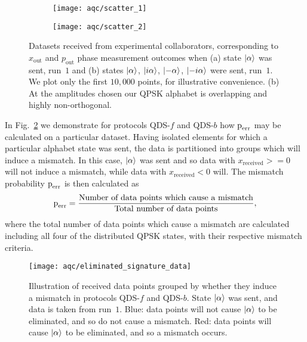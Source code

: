 \begin{figure}[htp]
\centering
	\begin{subfigure}{0.49\linewidth}
	\centering
	\texttt{[image: aqc/scatter\_1]}
	\caption{}
	\end{subfigure}
	\begin{subfigure}{0.49\linewidth}
	\centering
	\texttt{[image: aqc/scatter\_2]}
	\end{subfigure}
\caption{\label{fig:aqc_scatter} Datasets received from experimental collaborators, corresponding to $x_{\text{out}}$ and $p_{\text{out}}$ phase measurement outcomes when (a) state $\ket{\alpha}$ was sent, run~$1$ and (b) states $\ket{\alpha}$, $\ket{i \alpha}$, $\ket{- \alpha}$, $\ket{- i \alpha}$ were sent, run~$1$. We plot only the first $10,000$ points, for illustrative convenience. (b) At the amplitudes chosen our QPSK alphabet is overlapping and highly non-orthogonal.}
\end{figure}

In Fig.~\ref{fig:aqc_elimsig} we demonstrate for protocols QDS-$f$ and QDS-$b$ how $\text{p}_{\text{err}}$ may be calculated on a particular dataset. Having isolated elements for which a particular alphabet state was sent, the data is partitioned into groups which will induce a mismatch. In this case, $\ket{\alpha}$ was sent and so data with $x_{\text{received}} >=0$ will not induce a mismatch, while data with $x_{\text{received}}<0$ will. The mismatch probability $\text{p}_{\text{err}}$ is then calculated as
\begin{equation}\label{eqn:aqc_data_perr}
\text{p}_{\text{err}} = \frac{\text{Number of data points which cause a mismatch}}{\text{Total number of data points}},
\end{equation}
where the total number of data points which cause a mismatch are calculated including all four of the distributed QPSK states, with their respective mismatch criteria.

\begin{figure}[htp]
\centering
\texttt{[image: aqc/eliminated\_signature\_data]}
\caption{\label{fig:aqc_elimsig} Illustration of received data points grouped by whether they induce a mismatch in protocols QDS-$f$ and QDS-$b$. State $\ket{\alpha}$ was sent, and data is taken from run~$1$. Blue: data points will not cause $\ket{\alpha}$ to be eliminated, and so do not cause a mismatch. Red: data points will cause $\ket{\alpha}$ to be eliminated, and so a mismatch occurs.}
\end{figure}

